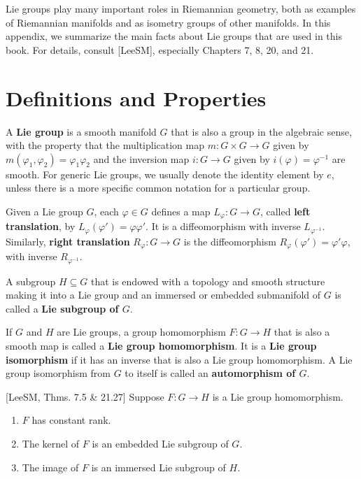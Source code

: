 
Lie groups play many important roles in Riemannian geometry, both as examples of Riemannian manifolds and as isometry groups of other manifolds. In this appendix, we summarize the main facts about Lie groups that are used in this book. For details, consult [LeeSM], especially Chapters 7, 8, 20, and 21.

\section{Definitions and Properties}

A \textbf{Lie group} is a smooth manifold $G$ that is also a group in the algebraic sense, with the property that the multiplication map $m : G \times G \to G$ given by $m(\varphi_1, \varphi_2) = \varphi_1 \varphi_2$ and the inversion map $i : G \to G$ given by $i(\varphi) = \varphi^{-1}$ are smooth. For generic Lie groups, we usually denote the identity element by $e$, unless there is a more specific common notation for a particular group.

Given a Lie group $G$, each $\varphi \in G$ defines a map $L_\varphi : G \to G$, called \textbf{left translation}, by $L_\varphi(\varphi') = \varphi \varphi'$. It is a diffeomorphism with inverse $L_{\varphi^{-1}}$. Similarly, \textbf{right translation} $R_\varphi : G \to G$ is the diffeomorphism $R_\varphi(\varphi') = \varphi' \varphi$, with inverse $R_{\varphi^{-1}}$.

A subgroup $H \subseteq G$ that is endowed with a topology and smooth structure making it into a Lie group and an immersed or embedded submanifold of $G$ is called a \textbf{Lie subgroup of $G$}.

If $G$ and $H$ are Lie groups, a group homomorphism $F : G \to H$ that is also a smooth map is called a \textbf{Lie group homomorphism}. It is a \textbf{Lie group isomorphism} if it has an inverse that is also a Lie group homomorphism. A Lie group isomorphism from $G$ to itself is called an \textbf{automorphism of $G$}.

\begin{proposition}\label{prop:lie-group-homomorphism-properties}
[LeeSM, Thms. 7.5 \& 21.27] Suppose $F : G \to H$ is a Lie group homomorphism.
\begin{enumerate}
\item[(a)] $F$ has constant rank.
\item[(b)] The kernel of $F$ is an embedded Lie subgroup of $G$.
\item[(c)] The image of $F$ is an immersed Lie subgroup of $H$.
\end{enumerate}
\end{proposition}

